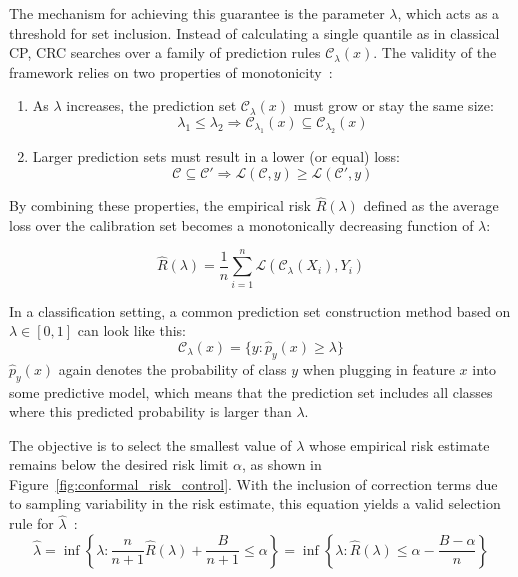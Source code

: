 The mechanism for achieving this guarantee is the parameter $\lambda$, which acts as a threshold for set inclusion. Instead of calculating a single quantile as in classical \gls{CP}, \gls{CRC} searches over a family of prediction rules $\mathcal{C}_\lambda(x)$. The validity of the framework relies on two properties of monotonicity~\cite{Angelopoulos-ConformalPredictionTheory-2025}:

\begin{enumerate}
    \item As $\lambda$ increases, the prediction set $\mathcal{C}_\lambda(x)$ must grow or stay the same size: 
    $$\lambda_1 \le \lambda_2 \Rightarrow \mathcal{C}_{\lambda_1}(x) \subseteq \mathcal{C}_{\lambda_2}(x)$$
    \item Larger prediction sets must result in a lower (or equal) loss: 
    $$\mathcal{C} \subseteq \mathcal{C}' \Rightarrow \mathcal{L}(\mathcal{C}, y) \ge \mathcal{L}(\mathcal{C}', y)$$
\end{enumerate}

By combining these properties, the empirical risk $\widehat{R}(\lambda)$ defined as the average loss over the calibration set becomes a monotonically decreasing function of $\lambda$:

$$\widehat{R}(\lambda) = \frac{1}{n} \sum_{i=1}^n \mathcal{L}(\mathcal{C}_{\lambda}(X_i), Y_i)$$

In a classification setting, a common prediction set construction method based on $\lambda \in [0, 1]$ can look like this:
$$\mathcal{C}_\lambda(x) = \{y : \hat{p}_y(x) \ge \lambda\}$$
$\hat{p}_y(x)$ again denotes the probability of class $y$ when plugging in feature $x$ into some predictive model, which means that the prediction set includes all classes where this predicted probability is larger than $\lambda$.

The objective is to select the smallest value of $\lambda$ whose empirical risk estimate remains below the desired risk limit $\alpha$, as shown in Figure~\ref{fig:conformal_risk_control}. With the inclusion of correction terms due to sampling variability in the risk estimate, this equation yields a valid selection rule for $\widehat{\lambda}$~\cite{Angelopoulus-ConformalRiskControl-2025, Angelopoulos-ConformalPredictionTheory-2025}:
$$\widehat{\lambda} = \inf \left\{ \lambda : \frac{n}{n+1} \widehat{R}(\lambda) + \frac{B}{n+1} \leq \alpha \right\} = \inf \left\{ \lambda: \widehat{R}(\lambda) \leq \alpha - \frac{B - \alpha}{n} \right\}$$

